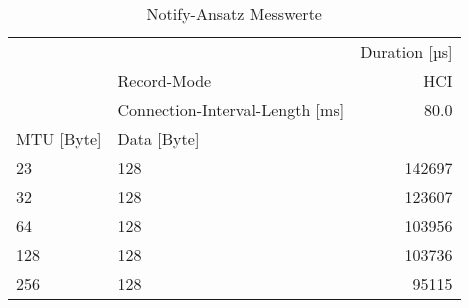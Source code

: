 \begin{table}
\centering
\caption{Notify-Ansatz Messwerte}
\label{table:generalnotifyrecords}
\begin{tabular}{llr}
\toprule
    & {} & Duration [µs] \\
    & Record-Mode &      HCI \\
    & Connection-Interval-Length [ms] &     80.0 \\
MTU [Byte] & Data [Byte] &          \\
\midrule
23  & 128 &   142697 \\
32  & 128 &   123607 \\
64  & 128 &   103956 \\
128 & 128 &   103736 \\
256 & 128 &    95115 \\
\bottomrule
\end{tabular}
\end{table}
